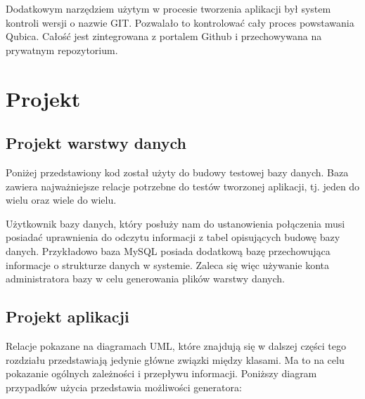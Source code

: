 \documentclass[12pt]{report}
\begin{document}
Dodatkowym narzędziem użytym w procesie tworzenia aplikacji był system kontroli wersji o nazwie GIT. Pozwalało to kontrolować cały proces powstawania Qubica. Całość jest zintegrowana z portalem Github i przechowywana na prywatnym repozytorium.

\section{Projekt}
\subsection{Projekt warstwy danych}\label{sec:database}
\indent Poniżej przedstawiony kod został użyty do budowy {\color{black} testowej} bazy danych. Baza zawiera najważniejsze relacje potrzebne do testów tworzonej aplikacji, tj. jeden do wielu oraz wiele do wielu.
\begin{framed}

\end{framed}

Użytkownik bazy danych, który posłuży nam do ustanowienia połączenia musi posiadać uprawnienia do odczytu informacji z tabel opisujących budowę bazy danych. Przykładowo baza MySQL posiada dodatkową bazę przechowująca informacje o strukturze danych w systemie. Zaleca się więc używanie konta administratora bazy w celu generowania plików warstwy danych.\\
\subsection{Projekt aplikacji}
	 Relacje pokazane na diagramach UML, które znajdują się w dalszej części tego rozdziału przedstawiają jedynie główne związki między klasami. Ma to na celu pokazanie ogólnych zależności i przepływu informacji. Poniższy diagram przypadków użycia przedstawia możliwości generatora:
\end{document}
